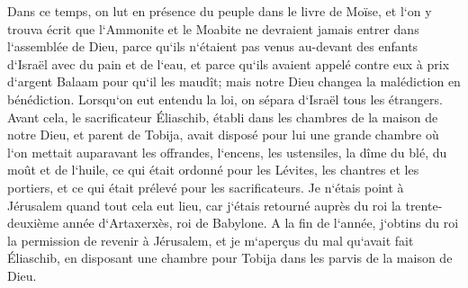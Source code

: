 \verse Dans ce temps, on lut en présence du peuple dans le livre de Moïse, et l`on y trouva écrit que l`Ammonite et le Moabite ne devraient jamais entrer dans l`assemblée de Dieu, 
\verse parce qu`ils n`étaient pas venus au-devant des enfants d`Israël avec du pain et de l`eau, et parce qu`ils avaient appelé contre eux à prix d`argent Balaam pour qu`il les maudît; mais notre Dieu changea la malédiction en bénédiction. 
\verse Lorsqu`on eut entendu la loi, on sépara d`Israël tous les étrangers. 
\verse Avant cela, le sacrificateur Éliaschib, établi dans les chambres de la maison de notre Dieu, et parent de Tobija, 
\verse avait disposé pour lui une grande chambre où l`on mettait auparavant les offrandes, l`encens, les ustensiles, la dîme du blé, du moût et de l`huile, ce qui était ordonné pour les Lévites, les chantres et les portiers, et ce qui était prélevé pour les sacrificateurs. 
\verse Je n`étais point à Jérusalem quand tout cela eut lieu, car j`étais retourné auprès du roi la trente-deuxième année d`Artaxerxès, roi de Babylone. 
\verse A la fin de l`année, j`obtins du roi la permission de revenir à Jérusalem, et je m`aperçus du mal qu`avait fait Éliaschib, en disposant une chambre pour Tobija dans les parvis de la maison de Dieu. 
